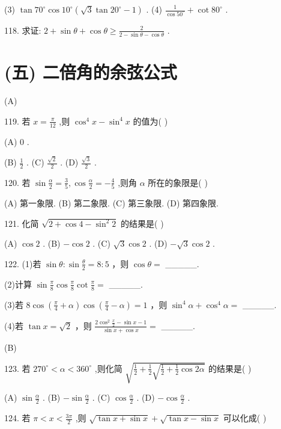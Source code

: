 \documentclass[10pt]{article}
\begin{document}
(3) \(\tan {70}^{ \circ  }\cos {10}^{ \circ  }\left( {\sqrt{3}\tan {20}^{ \circ  } - 1}\right)\) . (4) \(\frac{1}{\cos {50}^{ \circ  }} + \cot {80}^{ \circ  }\) .

118. 求证: \(2 + \sin \theta  + \cos \theta  \geq  \frac{2}{2 - \sin \theta  - \cos \theta }\) .

\section*{(五) 二倍角的余弦公式}

(A)

119. 若 \(x = \frac{\pi }{12}\) ,则 \({\cos }^{4}x - {\sin }^{4}x\) 的值为( )

(A) 0 .

(B) \(\frac{1}{2}\) . (C) \(\frac{\sqrt{2}}{2}\) . (D) \(\frac{\sqrt{3}}{2}\) .

120. 若 \(\sin \frac{\alpha }{2} = \frac{3}{5},\cos \frac{\alpha }{2} =  - \frac{4}{5}\) ,则角 \(\alpha\) 所在的象限是( )

(A) 第一象限. (B) 第二象限. (C) 第三象限. (D) 第四象限.

121. 化简 \(\sqrt{2 + \cos 4 - {\sin }^{2}2}\) 的结果是( )

(A) \(\cos 2\) . (B) \(- \cos 2\) . (C) \(\sqrt{3}\cos 2\) . (D) \(- \sqrt{3}\cos 2\) .

122. (1)若 \(\sin \theta  : \sin \frac{\theta }{2} = 8 : 5\) ，则 \(\cos \theta  =\) \_\_\_\_\_.

(2)计算 \(\sin \frac{\pi }{8}\cos \frac{\pi }{8}\cot \frac{\pi }{8} =\) \_\_\_\_\_.

(3)若 \(8\cos \left( {\frac{\pi }{4} + \alpha }\right) \cos \left( {\frac{\pi }{4} - \alpha }\right)  = 1\) ，则 \({\sin }^{4}\alpha  + {\cos }^{4}\alpha  =\) \_\_\_\_\_.

(4)若 \(\tan x = \sqrt{2}\) ，则 \(\frac{2{\cos }^{2}\frac{x}{2} - \sin x - 1}{\sin x + \cos x} =\) \_\_\_\_\_.

(B)

123. 若 \({270}^{ \circ  } < \alpha  < {360}^{ \circ  }\) ,则化简 \(\sqrt{\frac{1}{2} + \frac{1}{2}\sqrt{\frac{1}{2} + \frac{1}{2}\cos {2\alpha }}}\) 的结果是( )

(A) \(\sin \frac{\alpha }{2}\) . (B) \(- \sin \frac{\alpha }{2}\) . (C) \(\cos \frac{\alpha }{2}\) . (D) \(- \cos \frac{\alpha }{2}\) .

124. 若 \(\pi  < x < \frac{3\pi }{2}\) ,则 \(\sqrt{\tan x + \sin x} + \sqrt{\tan x - \sin x}\) 可以化成( )
\end{document}
